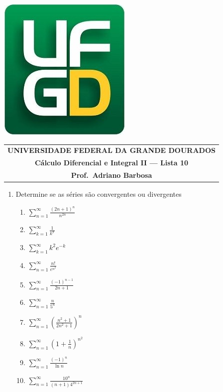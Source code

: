 \documentclass[a4paper,5pt]{amsbook}
\newcommand{\ds}{\displaystyle}
\begin{document}
\thispagestyle{empty}
\pagestyle{empty}
\begin{minipage}[h]{0.14\textwidth}
    \includegraphics[scale=0.24]{../../ufgd.png}
\end{minipage}
\begin{minipage}[h]{\textwidth}
    \begin{tabular}{c}
        {{\bf UNIVERSIDADE FEDERAL DA GRANDE DOURADOS}}\\
        {{\bf C\'{a}lculo Diferencial e Integral II --- Lista 10}}\\
        {{\bf Prof.\ Adriano Barbosa}}\\
    \end{tabular}
    \vspace{-0.45cm}
\end{minipage}


\vspace{1cm}
\begin{enumerate}
    \setlength\itemsep{0.5cm}
    \item Determine se as s\'eries s\~ao convergentes ou divergentes
    	\begin{enumerate}
            \setlength\itemsep{0.2cm}
    		\item $\ds\sum_{n=1}^\infty \frac{(2n+1)^n}{n^{2n}}$
    		\item $\ds\sum_{k=1}^\infty \frac{1}{k^\pi}$
    		\item $\ds\sum_{k=1}^\infty k^2 e^{-k}$
    		\item $\ds\sum_{n=1}^\infty \frac{n!}{e^{n^2}}$
            \item $\ds\sum_{n=1}^\infty \frac{(-1)^{n-1}}{2n+1}$
            \item $\ds\sum_{n=1}^\infty \frac{n}{5^n}$
            \item $\ds\sum_{n=1}^\infty \left(\frac{n^2+1}{2n^2+1}\right)^n$
            \item $\ds\sum_{n=1}^\infty \left(1+\frac{1}{n}\right)^{n^2}$
            \item $\ds\sum_{n=1}^\infty \frac{(-1)^n}{\ln{n}}$
            \item $\ds\sum_{n=1}^\infty \frac{10^n}{(n+1)4^{2n+1}}$
    	\end{enumerate}
\end{enumerate}
\end{document}
